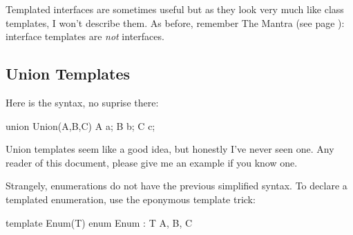 Templated interfaces are sometimes useful but as they look very much like class templates, I won't describe them. As before, remember The Mantra (see page \pageref{mantra}): interface templates are \emph{not} interfaces.

\subsection{Union Templates}

Here is the syntax, no suprise there:

\begin{dcode}
union Union(A,B,C) { A a; B b; C c;}
\end{dcode}

Union templates seem like a good idea, but honestly I've never seen one. Any reader of this document, please give me an example if you know one. 

Strangely, enumerations do not have the previous simplified syntax. To declare a templated enumeration, use the eponymous template trick:

\begin{dcode}
template Enum(T)
{
    enum Enum : T { A, B, C}
}
\end{dcode}
